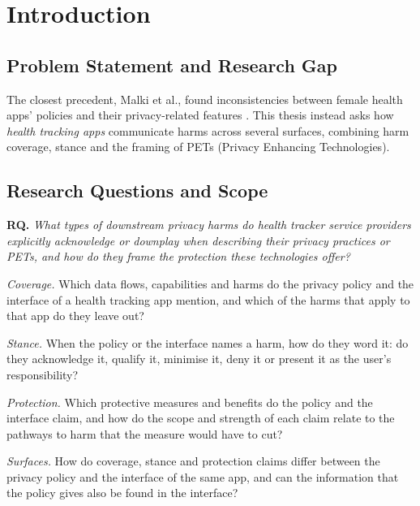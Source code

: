 \chapter{Introduction}
\label{ch:introduction}

\section{Problem Statement and Research Gap}
The closest precedent, Malki et al., found inconsistencies between female
health apps' policies and their privacy-related features
\parencite{malki2024exploring}. This thesis instead asks how \emph{health tracking apps} communicate harms across several surfaces, combining harm
coverage, stance and the framing of PETs (Privacy Enhancing Technologies). 

\section{Research Questions and Scope}
\label{sec:rq-scope}
\noindent\textbf{RQ.} \emph{What types of downstream privacy harms do health
tracker service providers explicitly acknowledge or downplay when describing
their privacy practices or PETs, and how do they frame the protection these
technologies offer?}

\begin{description}[leftmargin=1.5em,itemsep=1pt,topsep=3pt,
                    labelindent=0pt,font=\normalfont\bfseries]
  \item[RQ1] \textit{Coverage.} Which data flows, capabilities and harms do the
    privacy policy and the interface of a health tracking app mention, and which of
    the harms that apply to that app do they leave out?
  \item[RQ2] \textit{Stance.} When the policy or the interface names a harm, how do
    they word it: do they acknowledge it, qualify it, minimise it, deny it or
    present it as the user's responsibility?
  \item[RQ3] \textit{Protection.} Which protective measures and benefits do the
    policy and the interface claim, and how do the scope and strength of each
    claim relate to the pathways to harm that the measure would have to cut?
  \item[RQ4] \textit{Surfaces.} How do coverage, stance and protection claims
    differ between the privacy policy and the interface of the same app, and
    can the information that the policy gives also be found in the interface?
\end{description}

